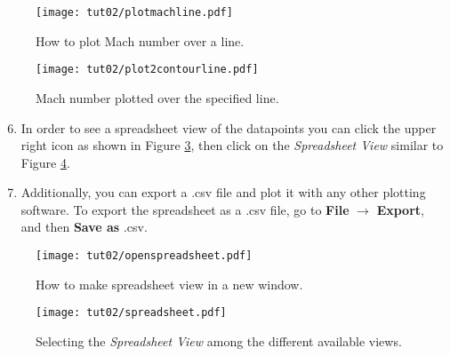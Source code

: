 \begin{figure}[H]
	\centering
	\texttt{[image: tut02/plotmachline.pdf]}
	\caption{How to plot Mach number over a line.}
	\label{fig2:plot_line_setting}
\end{figure}
\begin{figure}[ht]
	\centering
	\texttt{[image: tut02/plot2contourline.pdf]}
	\caption{Mach number plotted over the specified line.}
	\label{fig2:plot_line}
\end{figure}
\begin{enumerate}[label=\arabic*)]
	\setcounter{enumi}{5}
	\item In order to see a spreadsheet view of the datapoints you can click the upper right icon as shown in Figure \ref{fig2:open_spreadsheet}, then click on the \textit{Spreadsheet View} similar to Figure \ref{fig2:spreadsheet}.
	\item Additionally, you can export a .csv file and plot it with any other plotting software. To export the spreadsheet as a .csv file, go to \textbf{File} $\rightarrow$ \textbf{Export}, and then \textbf{Save as} .csv.
\end{enumerate}
\begin{figure}[ht]
    \centering
    \texttt{[image: tut02/openspreadsheet.pdf]}
    \caption{How to make spreadsheet view in a new window.}
    \label{fig2:open_spreadsheet}
\end{figure}
\begin{figure}[ht]
    \centering
    \texttt{[image: tut02/spreadsheet.pdf]}
    \caption{Selecting the \textit{Spreadsheet View} among the different available views.}
    \label{fig2:spreadsheet}
\end{figure}

